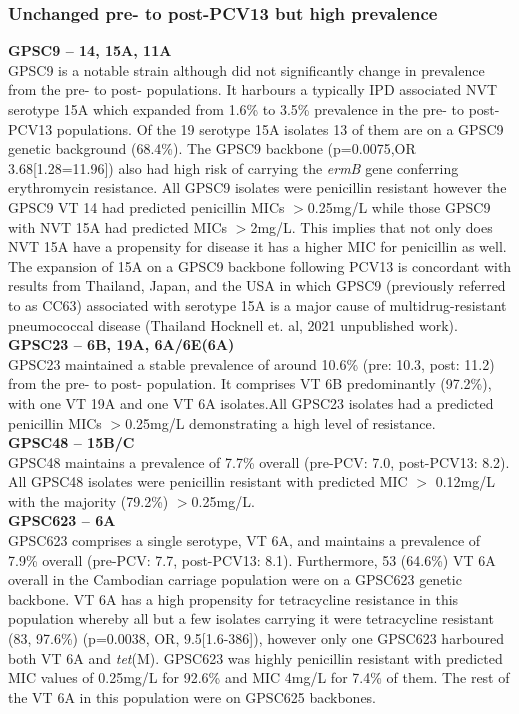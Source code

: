 \documentclass{article}
\begin{document}
\subsubsection{Unchanged pre- to post-PCV13 but high prevalence }
\textbf{GPSC9 – 14, 15A, 11A}
\\GPSC9 is a notable strain although did not significantly change in prevalence from the pre- to post- populations. It harbours a typically IPD associated NVT serotype 15A which expanded from 1.6\% to 3.5\% prevalence in the pre- to post-PCV13 populations\cite{turnerImpact13ValentPneumococcal2020}. Of the 19 serotype 15A isolates 13 of them are on a GPSC9 genetic background (68.4\%). 
The GPSC9 backbone (p=0.0075,OR 3.68[1.28=11.96]) also had high risk of carrying the \textit{ermB} gene conferring erythromycin resistance. All GPSC9 isolates were penicillin resistant however the GPSC9 VT 14 had predicted penicillin MICs $>$0.25mg/L while those GPSC9 with NVT 15A had predicted MICs $>$2mg/L. This implies that not only does NVT 15A have a propensity for disease it has a higher MIC for penicillin as well. The expansion of 15A on a GPSC9 backbone following PCV13 is concordant with results from Thailand, Japan, and the USA in which GPSC9 (previously referred to as CC63) associated with serotype 15A is a major cause of multidrug-resistant pneumococcal disease \cite{nakanoNationwideSurveillancePaediatric2020, metcalfUsingWholeGenome2016} (Thailand Hocknell et. al, 2021 unpublished work).
\\\textbf{GPSC23 – 6B, 19A, 6A/6E(6A) }
\\GPSC23 maintained a stable prevalence of around 10.6\% (pre: 10.3, post: 11.2) from the pre- to post- population. It comprises VT 6B predominantly (97.2\%), with one VT 19A and one VT 6A isolates.All GPSC23 isolates had a predicted penicillin MICs $>$0.25mg/L demonstrating a high level of resistance. 
\\\textbf{GPSC48 – 15B/C }
\\GPSC48 maintains a prevalence of 7.7\% overall (pre-PCV: 7.0, post-PCV13: 8.2).  All GPSC48 isolates were penicillin resistant with predicted MIC $>$ 0.12mg/L with the majority (79.2\%) $>$0.25mg/L. 
\\\textbf{GPSC623 – 6A }
\\GPSC623 comprises a single serotype, VT 6A, and maintains a prevalence of 7.9\% overall (pre-PCV: 7.7, post-PCV13: 8.1).  Furthermore, 53 (64.6\%) VT 6A overall in the Cambodian carriage population were on a GPSC623 genetic backbone. VT 6A has a high propensity for tetracycline resistance in this population whereby all but a few isolates carrying it were tetracycline resistant (83, 97.6\%) (p=0.0038, OR, 9.5[1.6-386]), however only one GPSC623 harboured both VT 6A and\textit{ tet}(M). GPSC623 was highly penicillin resistant with predicted MIC values of 0.25mg/L for 92.6\% and MIC 4mg/L for 7.4\% of them. The rest of the VT 6A in this population were on GPSC625 backbones. 
\end{document}
